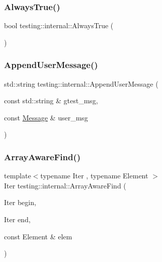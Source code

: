 \subsubsection{\texorpdfstring{AlwaysTrue()}{AlwaysTrue()}}
{\footnotesize\ttfamily bool testing\+::internal\+::\+Always\+True (\begin{DoxyParamCaption}{ }\end{DoxyParamCaption})}

\mbox{\label{namespacetesting_1_1internal_ae475a090bca903bb222dd389eb189166}} 
\subsubsection{\texorpdfstring{AppendUserMessage()}{AppendUserMessage()}}
{\footnotesize\ttfamily std\+::string testing\+::internal\+::\+Append\+User\+Message (\begin{DoxyParamCaption}\item[{const std\+::string \&}]{gtest\+\_\+msg,  }\item[{const \mbox{\hyperlink{classtesting_1_1Message}{Message}} \&}]{user\+\_\+msg }\end{DoxyParamCaption})}

\mbox{\label{namespacetesting_1_1internal_a94a857fe6ff32cf4fdc4769a4071f239}} 
\subsubsection{\texorpdfstring{ArrayAwareFind()}{ArrayAwareFind()}}
{\footnotesize\ttfamily template$<$typename Iter , typename Element $>$ \\
Iter testing\+::internal\+::\+Array\+Aware\+Find (\begin{DoxyParamCaption}\item[{Iter}]{begin,  }\item[{Iter}]{end,  }\item[{const Element \&}]{elem }\end{DoxyParamCaption})}

\mbox{\label{namespacetesting_1_1internal_af4bebf36baf0b0a5b26d051dde55fa47}} 
